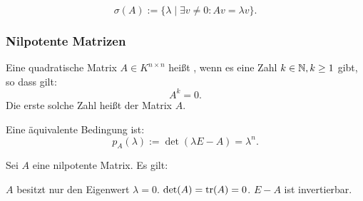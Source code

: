 \begin{equation}
\sigma(A) := \{\lambda\mid \exists v\ne 0\colon Av=\lambda v\}.
\end{equation}

\subsubsection{Nilpotente Matrizen}
\begin{definition}
Eine quadratische Matrix $A\in K^{n\times n}$ heißt ,
wenn es eine Zahl $k\in\mathbb N, k\ge 1$ gibt, so dass gilt:
\begin{equation}
A^k=0.
\end{equation}
Die erste solche Zahl heißt  der Matrix $A$.

Eine äquivalente Bedingung ist:
\begin{equation}
p_A(\lambda):=\det(\lambda E-A)=\lambda^n.
\end{equation}
\end{definition}

\noindent
{}
Sei $A$ eine nilpotente Matrix. Es gilt:
\begin{itemize}[itemsep=0pt, leftmargin=3em]
\bitem $A$ besitzt nur den Eigenwert $\lambda=0$.
\bitem $\det(A)=\operatorname{tr}(A)=0$.
\bitem $E-A$ ist invertierbar.
\end{itemize}

